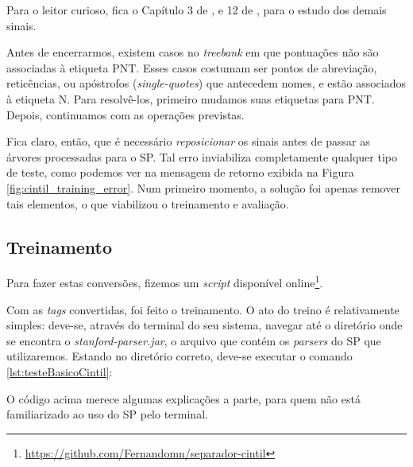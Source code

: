 \begin{center}
    
\end{center}

Para o leitor curioso, fica o Capítulo 3 de \cite{bracketing_ptb}, e 12 de \cite{cintil_handbook}, para o estudo dos demais sinais.

Antes de encerrarmos, existem casos no \textit{treebank} em que pontuações não são associadas à etiqueta PNT. Esses casos costumam ser pontos de abreviação, reticências, ou apóstrofos (\textit{single-quotes}) que antecedem nomes, e estão associados à etiqueta N. Para resolvê-los, primeiro mudamos suas etiquetas para PNT. Depois, continuamos com as operações previstas.

Fica claro, então, que é necessário \textit{reposicionar} os sinais antes de passar as árvores processadas para o SP. 
Tal erro inviabiliza completamente qualquer tipo de teste, como podemos ver na mensagem de retorno exibida na Figura \ref{fig:cintil_training_error}. Num primeiro momento, a solução foi apenas remover tais elementos, o que viabilizou o treinamento e avaliação.

\begin{center}
    
\end{center}

\subsection{Treinamento}\label{subsec:treinamento_cintil}
Para fazer estas conversões, fizemos um \textit{script} disponível online\footnote{\url{ https://github.com/Fernandomn/separador-cintil}}.

Com as \textit{tags} convertidas, foi feito o treinamento. O ato do treino é relativamente simples: deve-se, através do terminal do seu sistema, navegar até o diretório onde se encontra o \textit{stanford-parser.jar}, o arquivo que contém os \textit{parsers} do SP que utilizaremos. Estando no diretório correto, deve-se executar o comando \ref{lst:testeBasicoCintil}:

\begin{center}

\end{center}

O código acima merece algumas explicações a parte, para quem não está familiarizado ao uso do SP pelo terminal.

